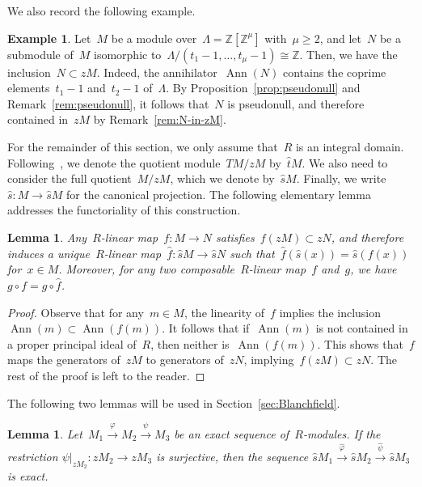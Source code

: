 \documentclass[10.9pt,a4paper]{amsart}
\newtheorem{lemma}[theorem]{Lemma}
\theoremstyle{definition}
\newtheorem{example}[theorem]{Example}
\theoremstyle{remark}
\newcommand{\Z}{\mathbb{Z}}
\newcommand{\shat}{\hat{s}}
\newcommand{\Ann}{\operatorname{Ann}}
\begin{document}
We also record the following example.

\begin{example}
\label{ex:Z-in-zM}
Let~$M$ be a module over~$\Lambda=\Z[\Z^\mu]$ with~$\mu\ge 2$, and let~$N$ be a submodule of~$M$
isomorphic to~$\Lambda/(t_1-1,\dots,t_\mu-1)\cong\Z$. Then, we have the inclusion~$N\subset zM$.
Indeed, the annihilator~$\Ann(N)$ contains the coprime elements~$t_1-1$ and~$t_2-1$ of~$\Lambda$. By Proposition~\ref{prop:pseudonull} and Remark~\ref{rem:pseudonull}, it follows that~$N$ is pseudonull, and therefore contained in~$zM$ by Remark~\ref{rem:N-in-zM}.
\end{example}


For the remainder of this section, we only assume that~$R$ is an integral domain.
Following~\cite{hillman2012}, we denote the quotient module~$TM/zM$ by~$\hat{t}M$.
We also need to consider the full quotient~$M/zM$, which we denote by~$\hat{s}M$.
Finally, we write~$\shat \colon M \to \shat M$ for the canonical projection. The following elementary lemma addresses the functoriality of this construction.

\begin{lemma}
\label{lemma:PnMapInduction}
Any~$R$-linear map~$f\colon M \to N$ satisfies~$f(zM) \subset zN$, and therefore induces a unique~$R$-linear map~$\hat{f} \colon \shat M \to \shat N$ such that~$\hat f(\shat(x)) = \shat (f(x))$ for~$x\in M$. Moreover, for any two composable~$R$-linear map~$f$ and~$g$, we have~$\widehat{g\circ f} = \hat g \circ \hat f$.
\end{lemma}

\begin{proof}
Observe that for any~$m\in M$, the linearity of~$f$ implies the inclusion~$\Ann(m)\subset\Ann(f(m))$. It follows that
if~$\Ann(m)$ is not contained in a proper principal ideal of~$R$, then neither is~$\Ann(f(m))$.
This shows that~$f$ maps the generators of~$zM$ to generators of~$zN$, implying~$f(zM)\subset zN$.
The rest of the proof is left to the reader.
\end{proof}

The following two lemmas will be used in Section~\ref{sec:Blanchfield}.

\begin{lemma}
\label{lemma:ExactSequencePseudonull}
Let~$M_1 \stackrel{\varphi}{\to} M_2 \stackrel{\psi}{\to} M_3$ be an exact sequence of~$R$-modules. If the restriction
$\psi \vert_{zM_2} \colon zM_2 \to zM_3$ is surjective, then the sequence $\shat M_1 \stackrel{\hat \varphi}{\to} \shat M_2 \stackrel{\hat \psi}{\to} \shat M_3$ is exact.
\end{lemma}
\end{document}
